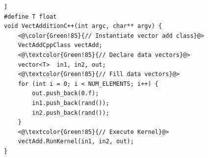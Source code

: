 \documentclass{sig-alternate-05-2015}
\begin{document}

\begin{lstlisting}[caption=Vector addition using
C++,label=vectcpp,float=[t!]]
#define T float
void VectAdditionC++(int argc, char** argv) {
	<@\color{Green!85}{// Instantiate vector add class}@>
	VectAddCppClass vectAdd;
	<@\textcolor{Green!85}{// Declare data vectors}@>
	vector<T>  in1, in2, out;
	<@\textcolor{Green!85}{// Fill data vectors}@>
	for (int i = 0; i < NUM_ELEMENTS; i++) {
		out.push_back(0.f);
		in1.push_back(rand());
		in2.push_back(rand());
	}
	<@\textcolor{Green!85}{// Execute Kernel}@>
	vectAdd.RunKernel(in1, in2, out);
}
\end{lstlisting}
\end{document}

